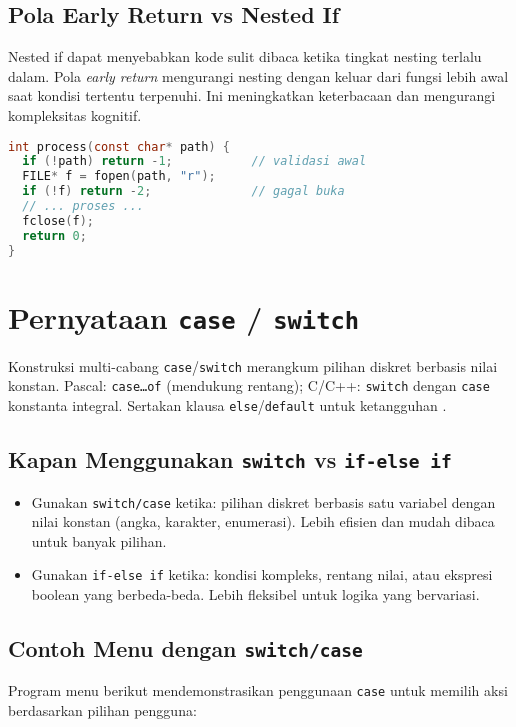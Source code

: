 \documentclass[../main.tex]{subfiles}
\begin{document}
\subsection{Pola Early Return vs Nested If}
Nested if dapat menyebabkan kode sulit dibaca ketika tingkat nesting terlalu dalam. Pola \emph{early return} mengurangi nesting dengan keluar dari fungsi lebih awal saat kondisi tertentu terpenuhi. Ini meningkatkan keterbacaan dan mengurangi kompleksitas kognitif.
\begin{lstlisting}[language=C]
int process(const char* path) {
  if (!path) return -1;           // validasi awal
  FILE* f = fopen(path, "r");
  if (!f) return -2;              // gagal buka
  // ... proses ...
  fclose(f);
  return 0;
}
\end{lstlisting}

\section{Pernyataan \texttt{case} / \texttt{switch}}
Konstruksi multi-cabang \texttt{case}/\texttt{switch} merangkum pilihan diskret berbasis nilai konstan. Pascal: \texttt{case\ldots of} (mendukung rentang); C/C++: \texttt{switch} dengan \texttt{case} konstanta integral. Sertakan klausa \texttt{else}/\texttt{default} untuk ketangguhan \parencite{pascal-tutorial-wikibooks,gnu-c-manual,cpp-reference,cpp-switch,cpp-enum-class}.

\subsection{Kapan Menggunakan \texttt{switch} vs \texttt{if-else if}}
\begin{itemize}
  \item Gunakan \texttt{switch/case} ketika: pilihan diskret berbasis satu variabel dengan nilai konstan (angka, karakter, enumerasi). Lebih efisien dan mudah dibaca untuk banyak pilihan.
  \item Gunakan \texttt{if-else if} ketika: kondisi kompleks, rentang nilai, atau ekspresi boolean yang berbeda-beda. Lebih fleksibel untuk logika yang bervariasi.
\end{itemize}

\subsection{Contoh Menu dengan \texttt{switch/case}}

Program menu berikut mendemonstrasikan penggunaan \texttt{case} untuk memilih aksi berdasarkan pilihan pengguna:
\end{document}
